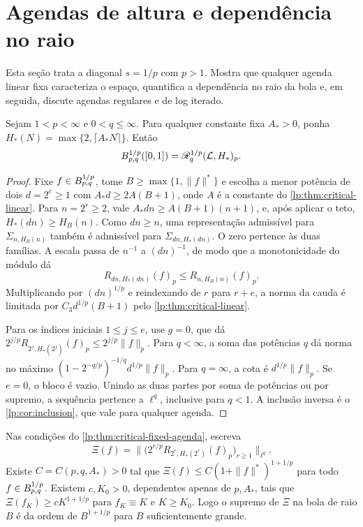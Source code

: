 \documentclass[12pt,a4paper]{article}
\begin{document}
\section{Agendas de altura e dependência no raio}

Esta seção trata a diagonal $s=1/p$ com $p>1$. Mostra que qualquer agenda linear fixa caracteriza o espaço, quantifica a dependência no raio da bola e, em seguida, discute agendas regulares e de log iterado.

\begin{teorema}
\label{lp:thm:critical-fixed-agenda}
Sejam $1<p<\infty$ e $0<q\le\infty$. Para qualquer constante fixa $A_*>0$, ponha $H_*(N)=\max\{2,\lceil A_*N\rceil\}$. Então
\[
 B^{1/p}_{p,q}([0,1])=\mathscr R^{1/p}_{q}(\mathcal L,H_*)_p.
\]
\end{teorema}

\begin{proof}
Fixe $f\in B^{1/p}_{p,q}$, tome $B\ge\max\{1,\|f\|^*\}$ e escolha a menor potência de dois $d=2^e\ge1$ com $A_*d\ge2A(B+1)$, onde $A$ é a constante do \cref{lp:thm:critical-linear}. Para $n=2^r\ge2$, vale $A_*dn\ge A(B+1)(n+1)$, e, após aplicar o teto, $H_*(dn)\ge H_B(n)$. Como $dn\ge n$, uma representação admissível para $\Sigma_{n,H_B(n)}$ também é admissível para $\Sigma_{dn,H_*(dn)}$. O zero pertence às duas famílias. A escala passa de $n^{-1}$ a $(dn)^{-1}$, de modo que a monotonicidade do módulo dá
\[
 R_{dn,H_*(dn)}(f)_p\le R_{n,H_B(n)}(f)_p.
\]
Multiplicando por $(dn)^{1/p}$ e reindexando de $r$ para $r+e$, a norma da cauda é limitada por $C_3d^{1/p}(B+1)$ pelo \cref{lp:thm:critical-linear}.

Para os índices iniciais $1\le j\le e$, use $g=0$, que dá $2^{j/p}R_{2^j,H_*(2^j)}(f)_p\le2^{j/p}\|f\|_p$. Para $q<\infty$, a soma das potências $q$ dá norma no máximo $(1-2^{-q/p})^{-1/q}d^{1/p}\|f\|_p$. Para $q=\infty$, a cota é $d^{1/p}\|f\|_p$. Se $e=0$, o bloco é vazio. Unindo as duas partes por soma de potências ou por supremo, a sequência pertence a $\ell^q$, inclusive para $q<1$. A inclusão inversa é o \cref{lp:cor:inclusion}, que vale para qualquer agenda.
\end{proof}

\begin{proposicao}
\label{lp:prop:critical-radius-growth}
Nas condições do \cref{lp:thm:critical-fixed-agenda}, escreva
\[
 \Xi(f)=\big\|\big(2^{r/p}R_{2^r,H_*(2^r)}(f)_p\big)_{r\ge1}\big\|_{\ell^q}.
\]
Existe $C=C(p,q,A_*)>0$ tal que $\Xi(f)\le C(1+\|f\|^*)^{1+1/p}$ para todo $f\in B^{1/p}_{p,q}$. Existem $c,K_0>0$, dependentes apenas de $p,A_*$, tais que $\Xi(f_K)\ge cK^{1+1/p}$ para $f_K\equiv K$ e $K\ge K_0$. Logo o supremo de $\Xi$ na bola de raio $B$ é da ordem de $B^{1+1/p}$ para $B$ suficientemente grande.
\end{proposicao}
\end{document}
